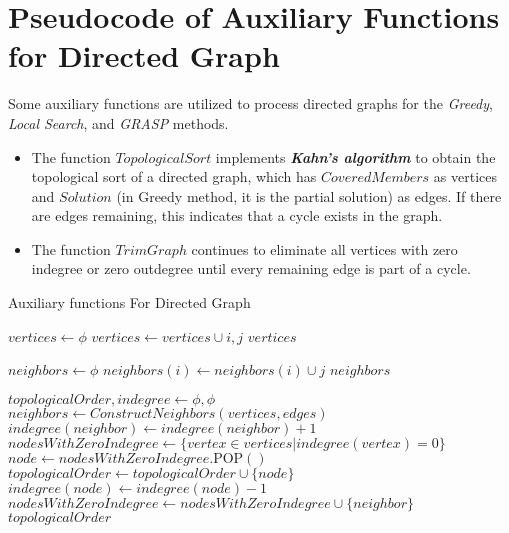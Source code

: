 \documentclass{article}
\begin{document}
\newpage
\appendix

\section{Pseudocode of Auxiliary Functions for Directed Graph}


Some auxiliary functions are utilized to process directed graphs for the \textit{Greedy}, \textit{Local Search}, and \textit{GRASP} methods.
\begin{itemize}
    \item The function $TopologicalSort$ implements \textbf{\textit{Kahn's algorithm}} to obtain the topological sort of a directed graph, which has $CoveredMembers$ as vertices and $Solution$ (in Greedy method, it is the partial solution) as edges. If there are edges remaining, this indicates that a cycle exists in the graph.
    \item The function $TrimGraph$ continues to eliminate all vertices with zero indegree or zero outdegree until every remaining edge is part of a cycle.
\end{itemize}

\begin{algorithm}[H]
\renewcommand{\thealgorithm}{}
\caption{Auxiliary functions For Directed Graph}
\begin{algorithmic}

\State $vertices \gets \phi$
\State $vertices \gets vertices \cup {i, j}$
\EndFor
\State \Return $vertices$
\EndFunction

\Statex

\State $neighbors \gets \phi$
\State $neighbors(i) \gets neighbors(i) \cup {j}$
\EndFor
\State \Return $neighbors$
\EndFunction

\Statex

\State $topologicalOrder, indegree \gets \phi, \phi$
\State $neighbors \gets ConstructNeighbors(vertices, edges)$
        \State $indegree(neighbor) \gets indegree(neighbor) + 1$
    \EndFor
\EndFor
\State $nodesWithZeroIndegree \gets \{vertex \in vertices| indegree(vertex) = 0\}$
    \State $node \gets nodesWithZeroIndegree.\textrm{POP}()$
    \State $topologicalOrder \gets topologicalOrder \cup \{node\}$
        \State $indegree(node) \gets indegree(node) - 1$
            \State $nodesWithZeroIndegree \gets nodesWithZeroIndegree \cup \{neighbor\}$
        \EndIf
    \EndFor
\EndWhile
\State \Return $topologicalOrder$
\EndFunction

\end{algorithmic}
\end{algorithm}
\end{document}
